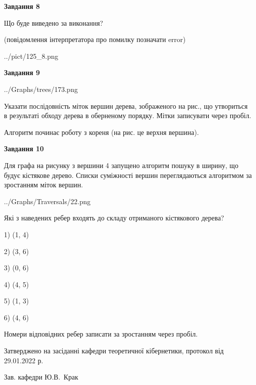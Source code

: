 \documentclass[12pt, ukrainian]{article}
\begin{document}
{\begin {large}
{\begin {center}\textbf{Завдання 8}\end {center}}\par
Що буде виведено за виконання?\par
 (повідомлення інтерпретатора про помилку позначати error)\par
\begin{center}
	{../pict/125_8.png}
\end{center}
\newpage

{\begin {center}\textbf{Завдання 9}\end {center}}\par

\begin{center}
	{../Graphs/trees/173.png}
\end{center}
Указати послідовність міток вершин дерева, зображеного на рис., що утвориться в результаті обходу дерева в оберненому порядку. Мітки записувати через пробіл.\par Алгоритм починає роботу з кореня (на рис. це верхня вершина).\par
\newpage

{\begin {center}\textbf{Завдання 10}\end {center}}\par
Для графа на рисунку з вершини 4 запущено алгоритм пошуку в ширину, що будує кістякове дерево. Списки суміжності вершин переглядаються алгоритмом за зростанням міток вершин.\par
\begin{center}
	{../Graphs/Traversals/22.png}
\end{center}
\par Які з наведених ребер входять до складу отриманого кістякового дерева?\par
1) (1, 4)\par
2) (3, 6)\par
3) (0, 6)\par
4) (4, 5)\par
5) (1, 3)\par
6) (4, 6)\par
{\vskip 15pt} Номери відповідних ребер записати за зростанням через пробіл.\par
\newpage


\end {large}
}
{\smallskip \begin {small} Затверджено на засіданні кафедри теоретичної кібернетики, протокол  від   29.01.2022 р.\par\smallskip\smallskip
{\parbox {6.5 cm}{Зав. кафедри \dotfill Ю.В.~Крак}} \end{small}}
\end{document}
